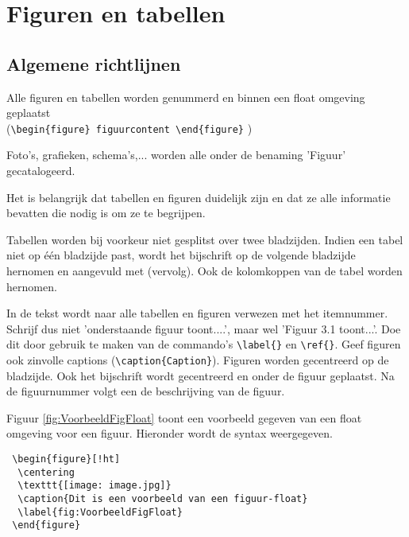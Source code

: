  
\chapter{Figuren en tabellen}
\section{Algemene richtlijnen}

 Alle figuren en tabellen worden genummerd en binnen een float omgeving geplaatst \\ (\verb|\begin{figure} figuurcontent \end{figure}| )
 
 Foto's, grafieken, schema's,... worden alle onder de benaming 'Figuur' 
 gecatalogeerd. 
 
 Het is belangrijk dat tabellen en figuren duidelijk zijn en dat ze alle informatie bevatten die nodig is om ze te begrijpen. 
 
 Tabellen worden bij voorkeur niet gesplitst over twee bladzijden. Indien een tabel niet op \'e\'en bladzijde past, wordt het bijschrift op de volgende bladzijde hernomen en aangevuld met (vervolg). Ook de kolomkoppen van de tabel worden hernomen.
 
 In de tekst wordt naar alle tabellen en figuren verwezen met het itemnummer. Schrijf dus niet 'onderstaande figuur toont....', maar wel 'Figuur 3.1 toont...'. Doe dit door gebruik te maken van de commando's \verb|\label{}| en \verb|\ref{}|. Geef figuren ook zinvolle captions (\verb|\caption{Caption}|).
 Figuren worden gecentreerd op de bladzijde. Ook het bijschrift wordt gecentreerd en onder de figuur geplaatst. Na de figuurnummer volgt een de beschrijving van de figuur. 
 
 Figuur \ref{fig:VoorbeeldFigFloat} toont een voorbeeld gegeven van een float omgeving voor een figuur. Hieronder wordt de syntax weergegeven.


\verb| \begin{figure}[!ht] |\\
\verb|	\centering|\\
\verb|	\texttt{[image: image.jpg]}|\\
\verb|	\caption{Dit is een voorbeeld van een figuur-float}|\\
\verb|	\label{fig:VoorbeeldFigFloat}|\\
\verb| \end{figure}|

